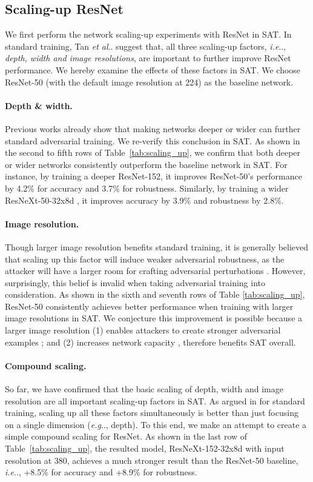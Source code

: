 \documentclass{article}
\makeatletter
\DeclareRobustCommand\onedot{\futurelet\@let@token\@onedot}
\def\@onedot{\ifx\@let@token.\else.\null\fi\xspace}
\def\eg{\emph{e.g}\onedot} \def\Eg{\emph{E.g}\onedot}
\def\ie{\emph{i.e}\onedot} \def\Ie{\emph{I.e}\onedot}
\def\etal{\emph{et al}\onedot}
\makeatother
\begin{document}
\subsection{Scaling-up ResNet}
We first perform the network scaling-up experiments with ResNet in SAT. In standard training, Tan \etal \cite{Tan2019} suggest that, all three scaling-up factors, \ie, \emph{depth, width and image resolutions}, are important to further improve ResNet performance. We hereby examine the effects of these factors in SAT. We choose ResNet-50 (with the default image resolution at 224) as the baseline network.

\paragraph{Depth \& width.}
Previous works \cite{Madry2018,xie2020intriguing} already show that making networks deeper or wider can further standard adversarial training. We re-verify this conclusion in SAT. As shown in the second to fifth rows of Table~\ref{tab:scaling_up}, we confirm that both deeper or wider networks consistently outperform the baseline network in SAT. For instance, by training a deeper ResNet-152, it improves ResNet-50's performance by 4.2\% for accuracy and 3.7\% for robustness. Similarly, by training a  wider ResNeXt-50-32x8d \cite{Xie2017}, it improves accuracy by 3.9\% and robustness by 2.8\%.

\paragraph{Image resolution.}
Though larger image resolution benefits standard training, it is generally believed that scaling up this factor will induce weaker adversarial robustness, as the attacker will have a larger room for crafting adversarial perturbations \cite{galloway2019batch}. However, surprisingly, this belief is invalid when taking adversarial training into consideration. As shown in the sixth and seventh rows of Table \ref{tab:scaling_up}, ResNet-50 consistently achieves better performance when training with larger image resolutions  in SAT. We conjecture this improvement is possible because a larger image resolution  (1) enables attackers to create stronger adversarial examples \cite{galloway2019batch}; and (2) increases network capacity \cite{Tan2019}, therefore benefits SAT overall. 

\paragraph{Compound scaling.}
So far, we have confirmed that the basic scaling of depth, width and image resolution are all important scaling-up factors in SAT. As argued in \cite{Tan2019} for standard training, scaling up all these factors simultaneously is better than just focusing on a single dimension (\eg, depth). To this end, we make an attempt to create a simple compound scaling for ResNet. As shown in the last row of Table~\ref{tab:scaling_up}, the resulted model, ResNeXt-152-32x8d with input resolution at 380, achieves a much stronger result than the ResNet-50 baseline, \ie, +8.5\% for accuracy and +8.9\% for robustness. 
\end{document}
